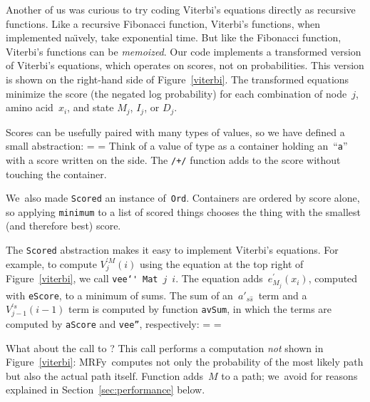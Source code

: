 \documentclass[preprint,nonatbib,blockstyle,times]{sigplanconf}
\newcommand\mrfy{MRFy} %
\newcommand\naive{na\"\i ve}
\newcommand\figref[1]{Figure~\ref{#1}}
\newcommand\secref[1]{Section~\ref{sec:#1}}
\newcommand\seclabel[1]{\label{sec:#1}}
\newif\ifverbatimsmall
\newcommand\smallverbatiminput[1]{%
  \verbatimsmalltrue
  \presvtopsep=\topsep
  \topsep=0.78\topsep
  \verbatimsmallfalse
  \topsep=\presvtopsep
}
\newcommand\smallfuzzverbatiminput[2]{%
  \hfuzz=#1 \smallverbatiminput{#2}\hfuzz=0pt }
\begin{document}

Another of us was curious to try coding Viterbi's equations
directly as recursive functions.
Like a recursive Fibonacci function, Viterbi's functions,
when implemented \naive ly,
take exponential time.
But like the Fibonacci function, Viterbi's functions can be
\emph{memoized}.
Our code implements a transformed version of Viterbi's equations, 
which operates on scores, not on probabilities.
This version is
shown on the right-hand side of \figref{viterbi}.
The transformed equations minimize the
score (the negated log probability) for each combination of
node~$j$, amino 
acid~$x_i$, and state $M_j$, $I_j$, or $D_j$.

Scores can be usefully paired with many types of values,
so we have defined a small abstraction:
\smallfuzzverbatiminput{10.8pt}{vscore}
Think of a value of type  as a container holding
 an~``\texttt a'' with a score written on the side.
The \texttt{/+/} function adds to the score without touching the
 container.

We~also made \texttt{Scored} an instance of~\texttt{Ord}.
Containers are ordered by score alone, so applying
\texttt{minimum} to a list of scored things chooses the thing with the
smallest (and therefore best) score.


\seclabel{cons}
\seclabel{vee-prime}

The \texttt{Scored} abstraction makes it easy to implement
Viterbi's equations.
For example, to compute $V_j^{\prime M}(i)$ using the equation at the top
right of \figref{viterbi}, we call 
\mbox{\texttt{vee\char`\'} \texttt{Mat} $j$ $i$}.
The equation adds~$e^{\prime}_{M_{j}}(x_{i})$, computed
with \texttt{eScore}, to a minimum of sums.
The sum of an~$a'_{s\hat s}$~term and a $V^{\prime s}_{j-1}(i-1)$ term 
is computed by function \texttt{avSum}, in which
the terms are computed by \texttt{aScore} and \texttt{vee''}, respectively:
\smallverbatiminput{vfix}
What about the call to
?
This call performs a computation \emph{not} shown in \figref{viterbi}:
\mrfy\ computes not only the {probability} of the most likely path but 
also the actual path itself.
Function  adds~$M$ to a path;
we~avoid \mbox{} for reasons explained
in \secref{performance} below. 
\end{document}
